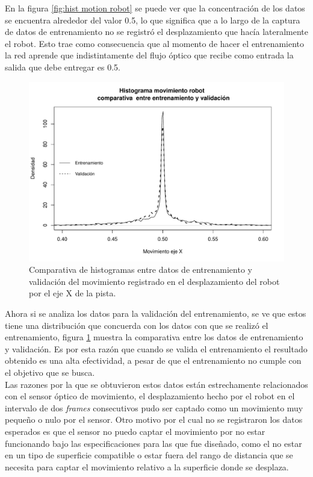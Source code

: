 \documentclass{iccmemoria}
\begin{document}
En la figura \ref{fig:hist motion robot} se puede ver que la concentración de los datos se encuentra alrededor del valor 0.5, lo que significa que a lo largo de la captura de datos de entrenamiento no se registró el desplazamiento que hacía lateralmente el robot. Esto trae como consecuencia que al momento de hacer el entrenamiento la red aprende que indistintamente del flujo óptico que recibe como entrada la salida que debe entregar es 0.5.\\

\begin{figure}[H]
  \centering
  \includegraphics[width = 450pt]{images/hist_motion_robot_training_vs_test.pdf}
  \caption[Histograma movimiento robot entrenamiento v/s validación]{Comparativa de histogramas entre datos de entrenamiento y validación del movimiento registrado en el desplazamiento del robot por el eje X de la pista.}
  \label{fig:hist motion robot training test}
\end{figure}

Ahora si se analiza los datos para la validación del entrenamiento, se ve que estos tiene una distribución que concuerda con los datos con que se realizó el entrenamiento, figura \ref{fig:hist motion robot training test} muestra la comparativa entre los datos de entrenamiento y validación. Es por esta razón que cuando se valida el entrenamiento el resultado obtenido es una alta efectividad, a pesar de que el entrenamiento no cumple con el objetivo que se busca.\\

Las razones por la que se obtuvieron estos datos están estrechamente relacionados con el sensor óptico de movimiento, el desplazamiento hecho por el robot en el intervalo de dos \emph{frames} consecutivos pudo ser captado como un movimiento muy pequeño o nulo por el sensor. Otro motivo por el cual no se registraron los datos esperados es que el sensor no puedo captar el movimiento por no estar funcionando bajo las especificaciones para las que fue diseñado, como el no estar en un tipo de superficie compatible o estar fuera del rango de distancia que se necesita para captar el movimiento relativo a la superficie donde se desplaza.\\
\end{document}
